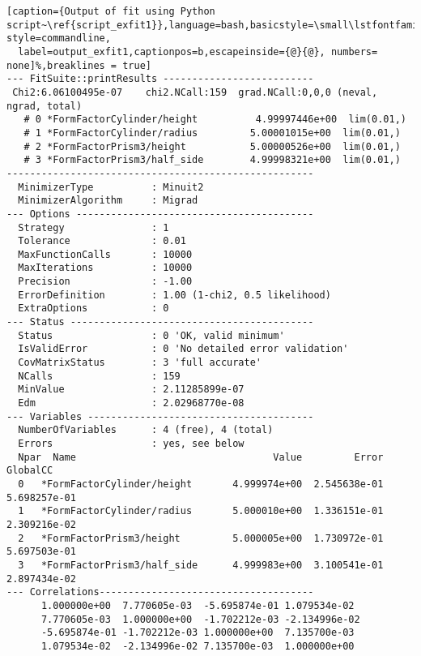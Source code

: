 \begin{lstlisting}[caption={Output of fit using Python script~\ref{script_exfit1}},language=bash,basicstyle=\small\lstfontfamily,% style=commandline,
  label=output_exfit1,captionpos=b,escapeinside={@}{@}, numbers= none]%,breaklines = true]
--- FitSuite::printResults --------------------------
 Chi2:6.06100495e-07    chi2.NCall:159  grad.NCall:0,0,0 (neval, ngrad, total)
   # 0 *FormFactorCylinder/height          4.99997446e+00  lim(0.01,)
   # 1 *FormFactorCylinder/radius         5.00001015e+00  lim(0.01,)
   # 2 *FormFactorPrism3/height           5.00000526e+00  lim(0.01,)
   # 3 *FormFactorPrism3/half_side        4.99998321e+00  lim(0.01,)
-----------------------------------------------------
  MinimizerType          : Minuit2
  MinimizerAlgorithm     : Migrad
--- Options -----------------------------------------
  Strategy               : 1
  Tolerance              : 0.01
  MaxFunctionCalls       : 10000
  MaxIterations          : 10000
  Precision              : -1.00
  ErrorDefinition        : 1.00 (1-chi2, 0.5 likelihood)
  ExtraOptions           : 0
--- Status ------------------------------------------ 
  Status                 : 0 'OK, valid minimum'
  IsValidError           : 0 'No detailed error validation'
  CovMatrixStatus        : 3 'full accurate'
  NCalls                 : 159
  MinValue               : 2.11285899e-07
  Edm                    : 2.02968770e-08
--- Variables ---------------------------------------
  NumberOfVariables      : 4 (free), 4 (total) 
  Errors                 : yes, see below
  Npar  Name                                  Value         Error         GlobalCC      
  0   *FormFactorCylinder/height       4.999974e+00  2.545638e-01  5.698257e-01  
  1   *FormFactorCylinder/radius       5.000010e+00  1.336151e-01  2.309216e-02  
  2   *FormFactorPrism3/height         5.000005e+00  1.730972e-01  5.697503e-01  
  3   *FormFactorPrism3/half_side      4.999983e+00  3.100541e-01  2.897434e-02  
--- Correlations-------------------------------------
      1.000000e+00  7.770605e-03  -5.695874e-01 1.079534e-02  
      7.770605e-03  1.000000e+00  -1.702212e-03 -2.134996e-02 
      -5.695874e-01 -1.702212e-03 1.000000e+00  7.135700e-03  
      1.079534e-02  -2.134996e-02 7.135700e-03  1.000000e+00  
\end{lstlisting}

